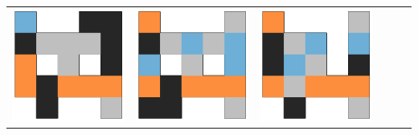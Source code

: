\begin{tabular}{cccccc}
    \includegraphics[scale=0.1]{images/top_designs/carrier/ga/exp5/gen29_ind3} &
    \includegraphics[scale=0.1]{images/top_designs/carrier/ga/exp5/gen29_ind4} &
    \includegraphics[scale=0.1]{images/top_designs/carrier/ga/exp5/gen29_ind5} \\
\end{tabular}
